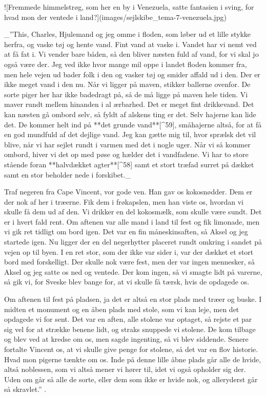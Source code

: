 \documentclass{book}
\begin{document}
![Fremmede himmelstrøg, som her en by i Venezuela, satte fantasien i sving, for hvad mon der
ventede i land?](images/sejlskibe_tema-7-venezuela.jpg)

 _”This, Charles, Hjulemand og jeg omme i floden, som løber ud et lille
stykke herfra, og vaske tøj og hente vand. Fint vand at vaske i. Vandet har vi nemt ved at
få fat i. Vi vender bare båden, så den bliver næsten fuld af vand, for vi skal jo også
være der. Jeg ved ikke hvor mange mil oppe i landet floden kommer fra, men hele vejen ud
bader folk i den og vasker tøj og smider affald ud i den. Der er ikke meget vand i den nu.
Når vi ligger på maven, stikker ballerne ovenfor. De sorte piger her har ikke badedragt
på, så de må ligge på maven hele tiden. Vi maver rundt mellem hinanden i al ærbarhed. Det
er meget fint drikkevand. Det kan næsten gå ombord selv, så fyldt af alskens ting er det.
Selv hajerne kan lide det. De kommer helt ind på **det grunde vand**[^59], småhajerne altså, for at
få en god mundfuld af det dejlige vand. Jeg kan gætte mig til, hvor sprælsk det vil blive,
når vi har sejlet rundt i varmen med det i nogle uger. Når vi så kommer ombord, hiver vi
det op med pøse og hælder det i vandfadene. Vi har to store stående foran **halvdækket agter**[^58]
samt et stort træfad surret på dækket samt en stor beholder nede i forskibet._

Traf negeren fra Cape Vincent, vor gode ven. Han gav os kokosnødder. Dem er der nok af her
i træerne. Fik dem i frøkapslen, men han viste os, hvordan vi skulle få dem ud af den. Vi
drikker en del kokosmælk, som skulle være sundt. Det er i hvert fald rent. Om aftenen var
alle mand i land til fest og fik limonade, men vi gik ret tidligt om bord igen. Det var en
fin måneskinsaften, så Aksel og jeg startede igen. Nu ligger der en del negerhytter
placeret rundt omkring i sandet på vejen op til byen. I en ret stor, som der ikke var
sider i, var der dækket et stort bord med forskelligt. Der skulle nok være fest, men der
var ingen mennesker, så Aksel og jeg satte os ned og ventede. Der kom ingen, så vi smagte
lidt på varerne, så gik vi, for Sveske blev bange for, at vi skulle få tærsk, hvis de
opdagede os.

Om aftenen til fest på pladsen, ja det er altså en stor plads med træer og buske. I midten
et monument og en åben plads med stole, som vi kan leje, men det opdagede vi for sent. Det
var en aften, alle stolene var optaget, så rejste et par sig vel for at strække benene
lidt, og straks snuppede vi stolene. De kom tilbage og blev ved at kredse om os, men sagde
ingenting, så vi blev siddende. Senere fortalte Vincent os, at vi skulle give penge for
stolene, så det var en flov historie. Hvad mon pigerne tænkte om os. Inde på denne lille
åbne plads går alle de hvide, altså noblessen, som vi altså mener vi hører til, idet vi
også opholder sig der. Uden om går så alle de sorte, eller dem som ikke er hvide nok, og
alleryderst går så skravlet.” .
\end{document}
